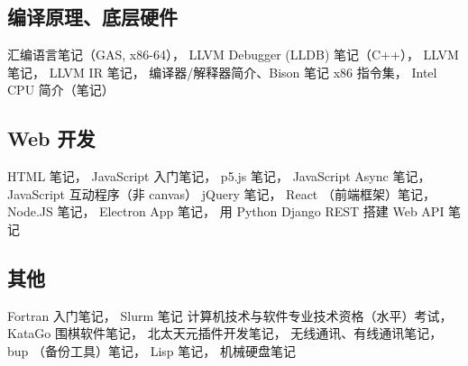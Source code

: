 \subsection{编译原理、底层硬件}
汇编语言笔记（GAS, x86-64），
LLVM Debugger (LLDB) 笔记（C++），
LLVM 笔记，
LLVM IR 笔记，
编译器/解释器简介、Bison 笔记
x86 指令集，
Intel CPU 简介（笔记）

\subsection{Web 开发}
HTML 笔记，
JavaScript 入门笔记，
p5.js 笔记，
JavaScript Async 笔记，
JavaScript 互动程序（非 canvas）
jQuery 笔记，
React （前端框架）笔记，
Node.JS 笔记，
Electron App 笔记，
用 Python Django REST 搭建 Web API 笔记

\subsection{其他}
Fortran 入门笔记，
Slurm 笔记
计算机技术与软件专业技术资格（水平）考试，
KataGo 围棋软件笔记，
北太天元插件开发笔记，
无线通讯、有线通讯笔记，
bup （备份工具）笔记，
Lisp 笔记，
机械硬盘笔记
